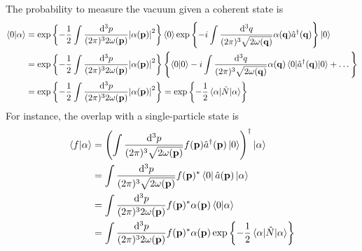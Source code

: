 The probability to measure the vacuum given a coherent state is
\begin{equation}
	\begin{split}
		\braket{0}{\alpha}
		&=
		\exp\left\{
			-
			\frac{1}{2}
			\int\frac{\dd[3]{p}}{(2\pi)^32\omega(\vb{p})}
			\abs{\alpha(\vb{p})}^2
		\right\}
		\expval{0}
		\exp\left\{
			-i
			\int\frac{\dd[3]{q}}{(2\pi)^3\sqrt{2\omega(\vb{q})}}
			\alpha(\vb{q})
			\hat{a}^\dagger(\vb{q})
		\right\}
		\ket{0}
		\\
		&=
		\exp\left\{
			-
			\frac{1}{2}
			\int\frac{\dd[3]{p}}{(2\pi)^32\omega(\vb{p})}
			\abs{\alpha(\vb{p})}^2
		\right\}
		\left\{
			\braket{0}
			-
			i\int\frac{\dd[3]{q}}{(2\pi)^3\sqrt{2\omega(\vb{q})}}
			\alpha(\vb{q})
			\expval{\hat{a}^\dagger(\vb{q})}{0}
			+
			\dots
		\right\}
		\\
		&=
		\exp\left\{
			-
			\frac{1}{2}
			\int\frac{\dd[3]{p}}{(2\pi)^32\omega(\vb{p})}
			\abs{\alpha(\vb{p})}^2
		\right\}
		=
		\exp\left\{
			-
			\frac{1}{2}
			\expval{\hat{N}}{\alpha}
		\right\}
	\end{split}
\end{equation}
For instance, the overlap with a single-particle state is
\begin{equation}
	\begin{split}
		\braket{f}{\alpha}
		&=
		\left(
			\int\frac{\dd[3]{p}}{(2\pi)^3\sqrt{2\omega(\vb{p})}}
			f(\vb{p})
			\hat{a}^\dagger(\vb{p})
			\ket{0}
		\right)^\dagger
		\ket{\alpha}
		\\
		&=
		\int\frac{\dd[3]{p}}{(2\pi)^3\sqrt{2\omega(\vb{p})}}
		f(\vb{p})^*
		\bra{0}
		\hat{a}(\vb{p})
		\ket{\alpha}
		\\
		&=
		\int\frac{\dd[3]{p}}{(2\pi)^32\omega(\vb{p})}
		f(\vb{p})^*
		\alpha(\vb{p})
		\braket{0}{\alpha}
		\\
		&=
		\int\frac{\dd[3]{p}}{(2\pi)^32\omega(\vb{p})}
		f(\vb{p})^*
		\alpha(\vb{p})
		\exp\left\{
			-
			\frac{1}{2}
			\expval{\hat{N}}{\alpha}
		\right\}
	\end{split}
\end{equation}